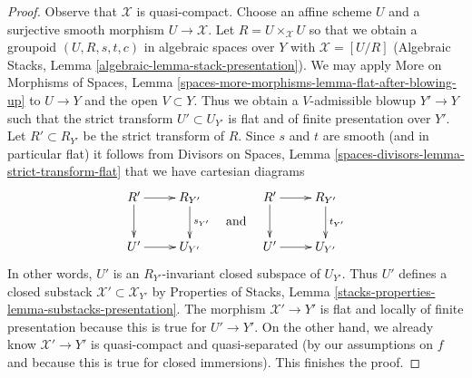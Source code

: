 \documentclass[10pt,a4paper]{amsart}
\theoremstyle{plain}
\theoremstyle{definition}
\theoremstyle{remark}
\numberwithin{equation}{subsection}
\begin{document}
\begin{proof}
Observe that $\mathcal{X}$ is quasi-compact.
Choose an affine scheme $U$ and a surjective smooth
morphism $U \to \mathcal{X}$.
Let $R = U \times_\mathcal{X} U$ so that we obtain
a groupoid $(U, R, s, t, c)$ in algebraic spaces over $Y$ with
$\mathcal{X} = [U/R]$
(Algebraic Stacks, Lemma \ref{algebraic-lemma-stack-presentation}).
We may apply
More on Morphisms of Spaces, Lemma
\ref{spaces-more-morphisms-lemma-flat-after-blowing-up}
to $U \to Y$ and the open $V \subset Y$.
Thus we obtain a $V$-admissible blowup $Y' \to Y$
such that the strict transform $U' \subset U_{Y'}$
is flat and of finite presentation over $Y'$.
Let $R' \subset R_{Y'}$ be the strict transform of $R$.
Since $s$ and $t$ are smooth (and in particular flat)
it follows from
Divisors on Spaces, Lemma
\ref{spaces-divisors-lemma-strict-transform-flat}
that we have cartesian diagrams
$$
\vcenter{
\xymatrix{
R' \ar[r] \ar[d] & R_{Y'} \ar[d]^{s_{Y'}} \\
U' \ar[r] & U_{Y'}
}
}
\quad\text{and}\quad
\vcenter{
\xymatrix{
R' \ar[r] \ar[d] & R_{Y'} \ar[d]^{t_{Y'}} \\
U' \ar[r] & U_{Y'}
}
}
$$
In other words, $U'$ is an $R_{Y'}$-invariant closed subspace
of $U_{Y'}$. Thus $U'$ defines a closed substack
$\mathcal{X}' \subset \mathcal{X}_{Y'}$ by
Properties of Stacks, Lemma
\ref{stacks-properties-lemma-substacks-presentation}.
The morphism $\mathcal{X}' \to Y'$ is flat and
locally of finite presentation because this is
true for $U' \to Y'$. On the other hand,
we already know $\mathcal{X}' \to Y'$ is quasi-compact and quasi-separated
(by our assumptions on $f$ and because this is true for closed immersions).
This finishes the proof.
\end{proof}
\end{document}

